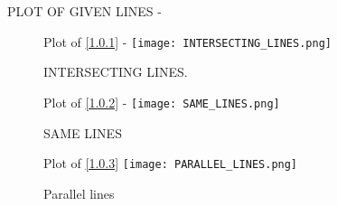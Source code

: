 \documentclass[journal,12pt,twocolumn]{IEEEtran}
\begin{document}
\begin{enumerate}
PLOT OF GIVEN LINES -

\begin{figure}[ht!]
Plot of \eqref{1.0.1} -
    \centering
    \texttt{[image: INTERSECTING\_LINES.png]}
    \caption{INTERSECTING LINES.}
    \label{fig:INTERSECTING LINES.}
\end{figure} 

\begin{figure}[ht!]
Plot of \eqref{1.0.2} -
    \centering
    \texttt{[image: SAME\_LINES.png]}
    \caption{SAME LINES}
    \label{fig:SAME LINES.}
\end{figure} 

\begin{figure}[ht]
Plot of \eqref{1.0.3} 
    \centering
   \texttt{[image: PARALLEL\_LINES.png]}
    \caption{Parallel lines}
    \label{fig: PARALLEL lines.}
\end{figure}    
\end{enumerate}
\end{document}
